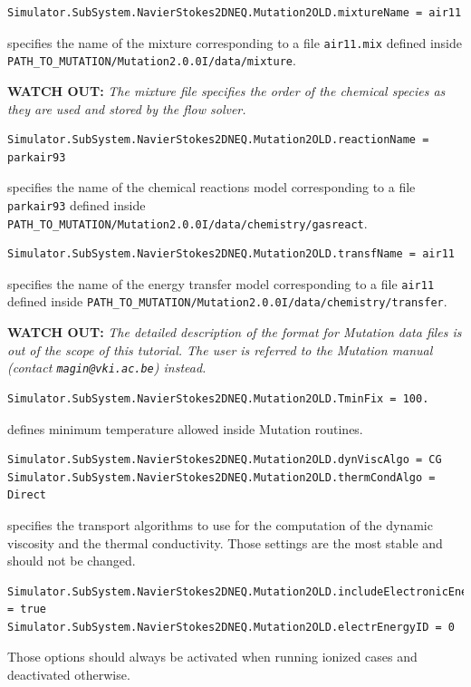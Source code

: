 \documentclass[11pt]{article}
\begin{document}
\begin{lstlisting}[breaklines]
Simulator.SubSystem.NavierStokes2DNEQ.Mutation2OLD.mixtureName = air11
\end{lstlisting}
specifies the name of the mixture corresponding to a file {\tt air11.mix} defined inside \\
{\tt PATH\_TO\_MUTATION/Mutation2.0.0I/data/mixture}.

{\bf WATCH OUT:} {\it The mixture file specifies the order of the chemical species as they are used and stored by the flow solver.}  

\begin{lstlisting}[breaklines]
Simulator.SubSystem.NavierStokes2DNEQ.Mutation2OLD.reactionName = parkair93
\end{lstlisting}
specifies the name of the chemical reactions model corresponding to a file {\tt parkair93} defined inside 
{\tt PATH\_TO\_MUTATION/Mutation2.0.0I/data/chemistry/gasreact}.

\begin{lstlisting}[breaklines]
Simulator.SubSystem.NavierStokes2DNEQ.Mutation2OLD.transfName = air11
\end{lstlisting}
specifies the name of the energy transfer model corresponding to a file {\tt air11} defined inside 
{\tt PATH\_TO\_MUTATION/Mutation2.0.0I/data/chemistry/transfer}.

{\bf WATCH OUT:} {\it The detailed description of the format for Mutation data files is out of the scope of this tutorial. 
  The user is referred to the Mutation manual (contact {\tt magin@vki.ac.be}) instead.}  

\begin{lstlisting}[breaklines]
Simulator.SubSystem.NavierStokes2DNEQ.Mutation2OLD.TminFix = 100.
\end{lstlisting}
defines minimum temperature allowed inside Mutation routines.

\begin{lstlisting}[breaklines]
Simulator.SubSystem.NavierStokes2DNEQ.Mutation2OLD.dynViscAlgo = CG
Simulator.SubSystem.NavierStokes2DNEQ.Mutation2OLD.thermCondAlgo = Direct
\end{lstlisting}
specifies the transport algorithms to use for the computation of the dynamic viscosity and the thermal conductivity.
Those settings are the most stable and should not be changed.

\begin{lstlisting}[breaklines]
Simulator.SubSystem.NavierStokes2DNEQ.Mutation2OLD.includeElectronicEnergy = true
Simulator.SubSystem.NavierStokes2DNEQ.Mutation2OLD.electrEnergyID = 0
\end{lstlisting}
Those options should always be activated when running ionized cases and deactivated otherwise.
\end{document}
